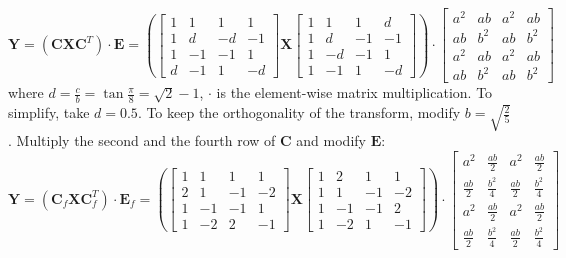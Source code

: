 \documentclass[a4paper,12pt,twoside]{article}
\begin{document}
\begin{equation}
    \mathbf{Y}=(\mathbf{CXC}^T)\cdot\mathbf{E}=\left(\begin{bmatrix}
        1&1&1&1\\
        1&d&-d&-1\\
        1&-1&-1&1\\
        d&-1&1&-d
    \end{bmatrix}\mathbf{X}\begin{bmatrix}
        1&1&1&d\\
        1&d&-1&-1\\
        1&-d&-1&1\\
        1&-1&1&-d
    \end{bmatrix}
    \right)\cdot\begin{bmatrix}
        a^2&ab&a^2&ab\\
        ab&b^2&ab&b^2\\
        a^2&ab&a^2&ab\\
        ab&b^2&ab&b^2
    \end{bmatrix}
\end{equation}
where $d=\frac{c}{b}=\tan{\frac{\pi}{8}}=\sqrt{2}-1$, $\cdot$ is the element-wise matrix multiplication. To simplify, take $d=0.5$. To keep the orthogonality of the transform, modify $b=\sqrt{\frac{2}{5}}$. Multiply the second and the fourth row of $\mathbf{C}$ and modify $\mathbf{E}$:
\begin{equation}
    \mathbf{Y}=(\mathbf{C}_f\mathbf{XC}_f^T)\cdot\mathbf{E}_f=\left(\begin{bmatrix}
        1&1&1&1\\
        2&1&-1&-2\\
        1&-1&-1&1\\
        1&-2&2&-1
    \end{bmatrix}\mathbf{X}\begin{bmatrix}
        1&2&1&1\\
        1&1&-1&-2\\
        1&-1&-1&2\\
        1&-2&1&-1
    \end{bmatrix}
    \right)\cdot\begin{bmatrix}
        a^2&\frac{ab}{2}&a^2&\frac{ab}{2}\\
        \frac{ab}{2}&\frac{b^2}{4}&\frac{ab}{2}&\frac{b^2}{4}\\
        a^2&\frac{ab}{2}&a^2&\frac{ab}{2}\\
        \frac{ab}{2}&\frac{b^2}{4}&\frac{ab}{2}&\frac{b^2}{4}
    \end{bmatrix}
\end{equation}
\end{document}

